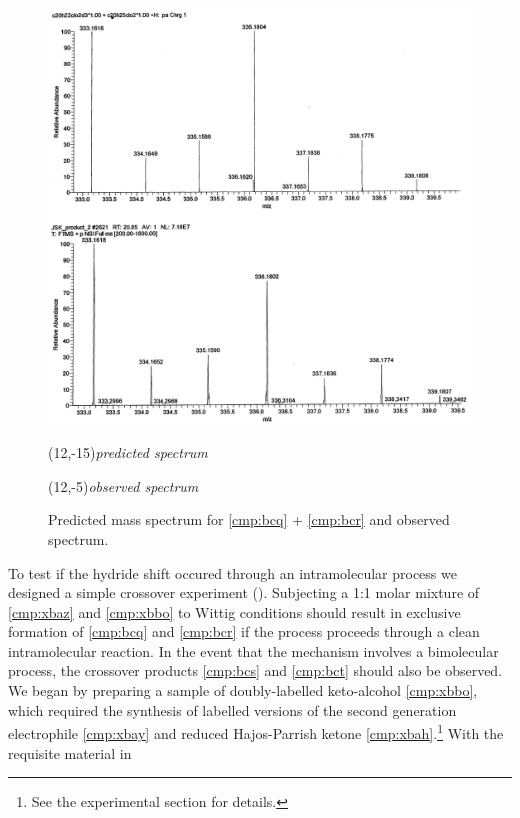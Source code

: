 \begin{figure}[t]
  \centering
\includegraphics[scale=0.8]{chp_singlecarbon/images/crossovermass}
  \begin{textblock}{5}(12,-15)\textit{\textsf{\small predicted spectrum}}\end{textblock}
   \begin{textblock}{5}(12,-5)\textit{\textsf{\small observed spectrum}}\end{textblock}
  \caption{Predicted mass spectrum for \ref{cmp:bcq} + \ref{cmp:bcr} and observed spectrum.}
  \label{fig:crossovermass}
\end{figure}
To test if the hydride shift occured through an intramolecular process we designed a simple
crossover experiment (). Subjecting a 1:1
molar mixture of \ref{cmp:xbaz} and \ref{cmp:xbbo} to Wittig conditions should result in exclusive
formation of \ref{cmp:bcq} and \ref{cmp:bcr} if the process proceeds through a clean intramolecular
reaction.
In the event that the mechanism involves a bimolecular process, the crossover products \ref{cmp:bcs}
and \ref{cmp:bct} should also be observed. We began by preparing a sample of doubly-labelled
keto-alcohol \ref{cmp:xbbo}, which required the synthesis of labelled versions of the
second generation electrophile \ref{cmp:xbay} and reduced Hajos-Parrish ketone
\ref{cmp:xbah}.\footnote{See the experimental section for details.} With the requisite material in
